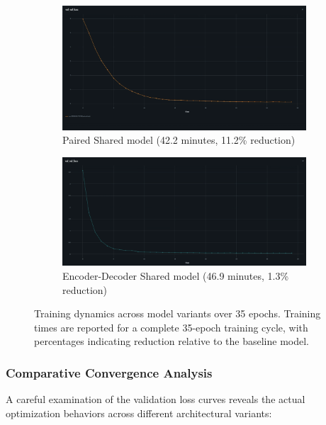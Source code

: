 \documentclass[12pt,a4paper]{article}
\begin{document}
\begin{enumerate}
\begin{figure}[H]
\begin{subfigure}[t]{0.48\textwidth}
    \centering
    \includegraphics[width=\linewidth]{pictures/intext_image/paired_shared.png}
    \caption{Paired Shared model (42.2 minutes, 11.2\% reduction)}
    \label{fig:paired_training}
\end{subfigure}
\hfill
\begin{subfigure}[t]{0.48\textwidth}
    \centering
    \includegraphics[width=\linewidth]{pictures/intext_image/enc_dec.png}
    \caption{Encoder-Decoder Shared model (46.9 minutes, 1.3\% reduction)}
    \label{fig:encdec_training}
\end{subfigure}

\caption{Training dynamics across model variants over 35 epochs. Training times are reported for a complete 35-epoch training cycle, with percentages indicating reduction relative to the baseline model.}
\label{fig:training_curves}
\end{figure}

\subsubsection{Comparative Convergence Analysis}

A careful examination of the validation loss curves reveals the actual optimization behaviors across different architectural variants:


\end{enumerate}
\end{document}
